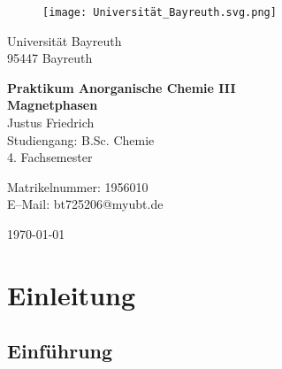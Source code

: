 \documentclass[12pt, a4paper]{article}
\begin{document}
\begin{figure}
    \texttt{[image: Universität\_Bayreuth.svg.png]}
\end{figure}



{\raggedright Universität Bayreuth\\  95447 Bayreuth}


\vspace{5cm}

\begin{center}
{\LARGE\bf{Praktikum Anorganische Chemie III}} \\  
\vspace{1cm}
{\Large\bf{Magnetphasen}}\\
\vspace{0.5cm}
{\large Justus Friedrich\\}
{Studiengang: B.Sc. Chemie\\}
{4. Fachsemester}
\end{center}





\thispagestyle{empty}
\begin{center}
{\small Matrikelnummer: 1956010 \\
E–Mail:  bt725206@myubt.de}
\end{center}

\vspace{5cm}

\today


\newpage
\tableofcontents
\thispagestyle{empty}


\newpage
\setcounter{page}{1}
\section{Einleitung}



\subsection{Einführung}
\end{document}
